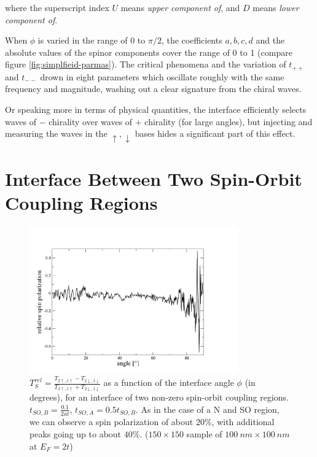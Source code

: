 where the superscript index $U$ means \emph{upper component of}, and $D$ means
\emph{lower component of}.

When $\phi$ is varied in the range of 0 to $\pi/2$, the coefficients $a, b, c,
d$ and the absolute values of the spinor components cover the range of 0 to 1
(compare figure \ref{fig:simplfieid-parmas}).
The critical phenomena and the variation of $t_{++}$ and $t_{--}$ drown in
eight parameters which oscillate roughly with the same frequency and
magnitude, washing out a clear signature from the chiral waves.

Or speaking more in terms of physical quantities, the interface efficiently
selects waves of $-$ chirality over waves of $+$ chirality (for large angles),
but injecting and measuring the waves in the $\uparrow,\downarrow$ bases
hides a significant part of this effect.

\section{Interface Between Two Spin-Orbit Coupling Regions}

\begin{figure}[htb]
    \begin{center}
        \includegraphics[width=0.8\textwidth]{relative-polarization-so-so.pdf}
    \end{center}
    \caption{$T_S^{rel} = \frac{T_{2\uparrow,1\uparrow} - T_{2\downarrow,1\downarrow}}
        {T_{2\uparrow,1\uparrow} + T_{2\downarrow,1\downarrow}}$ as
        a function of the interface angle $\phi$ (in degrees), for an
        interface of two non-zero spin-orbit coupling regions. $t_{SO,B} =
        \frac{0.1}{2 a t}$, $t_{SO,A} = 0.5 t_{SO,B}$. As in the case of
        a N and SO region, we can observe a spin polarization of about $20\%$,
          with additional peaks going up to about $40\%$.
        ($150 \times 150$ sample of $100~nm \times 100~nm$ at $E_F = 2 t$)
        }
    \label{fig:so-so-rel}
\end{figure}

